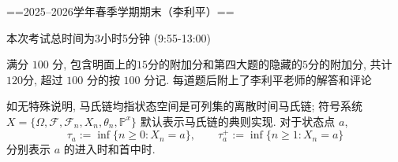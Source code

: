 
==2025--2026学年春季学期期末（李利平）==

本次考试总时间为3小时5分钟 (9:55-13:00)

满分 $100$ 分, 包含明面上的$15$分的附加分和第四大题的隐藏的$5$分的附加分, 共计$120$分, 超过 $100$ 分的按 $100$ 分记.
每道题后附上了李利平老师的解答和评论

如无特殊说明, 马氏链均指状态空间是可列集的离散时间马氏链; 符号系统
$X=\{\Omega,\mathscr F,\mathscr F_n,X_n,\theta_n,\mathbb P^x\}$ 默认表示马氏链的典则实现.
对于状态点 $a$,
\[
    \tau_a:=\inf\{n\geq 0:X_n=a\},\qquad
    \tau_a^+:=\inf\{n\geq 1:X_n=a\}
\]
分别表示 $a$ 的进入时和首中时.

